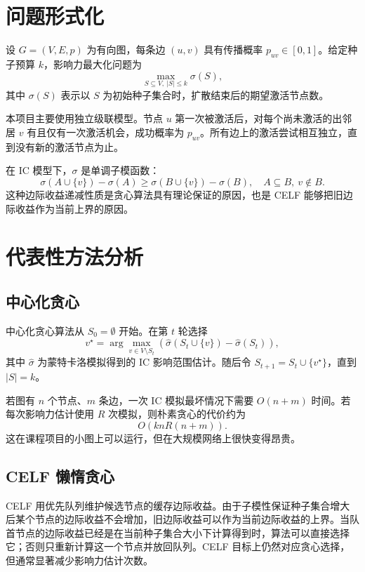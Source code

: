 \documentclass[UTF8, 11pt]{ctexart}
\begin{document}
\section{问题形式化}

设 $G=(V,E,p)$ 为有向图，每条边 $(u,v)$ 具有传播概率 $p_{uv}\in[0,1]$。给定种子预算 $k$，影响力最大化问题为
\[
    \max_{S\subseteq V,\ |S|\leq k} \sigma(S),
\]
其中 $\sigma(S)$ 表示以 $S$ 为初始种子集合时，扩散结束后的期望激活节点数。

本项目主要使用独立级联模型。节点 $u$ 第一次被激活后，对每个尚未激活的出邻居 $v$ 有且仅有一次激活机会，成功概率为 $p_{uv}$。所有边上的激活尝试相互独立，直到没有新的激活节点为止。

在 IC 模型下，$\sigma$ 是单调子模函数：
\[
    \sigma(A\cup\{v\})-\sigma(A)
    \geq
    \sigma(B\cup\{v\})-\sigma(B),
    \quad A\subseteq B,\ v\notin B.
\]
这种边际收益递减性质是贪心算法具有理论保证的原因，也是 CELF 能够把旧边际收益作为当前上界的原因。

\section{代表性方法分析}

\subsection{中心化贪心}

中心化贪心算法从 $S_0=\emptyset$ 开始。在第 $t$ 轮选择
\[
    v^\star =
    \arg\max_{v\in V\setminus S_t}
    \left(\widehat{\sigma}(S_t\cup\{v\})-\widehat{\sigma}(S_t)\right),
\]
其中 $\widehat{\sigma}$ 为蒙特卡洛模拟得到的 IC 影响范围估计。随后令 $S_{t+1}=S_t\cup\{v^\star\}$，直到 $|S|=k$。

若图有 $n$ 个节点、$m$ 条边，一次 IC 模拟最坏情况下需要 $O(n+m)$ 时间。若每次影响力估计使用 $R$ 次模拟，则朴素贪心的代价约为
\[
    O(k n R (n+m)).
\]
这在课程项目的小图上可以运行，但在大规模网络上很快变得昂贵。

\subsection{CELF 懒惰贪心}

CELF 用优先队列维护候选节点的缓存边际收益。由于子模性保证种子集合增大后某个节点的边际收益不会增加，旧边际收益可以作为当前边际收益的上界。当队首节点的边际收益已经是在当前种子集合大小下计算得到时，算法可以直接选择它；否则只重新计算这一个节点并放回队列。CELF 目标上仍然对应贪心选择，但通常显著减少影响力估计次数。
\end{document}
